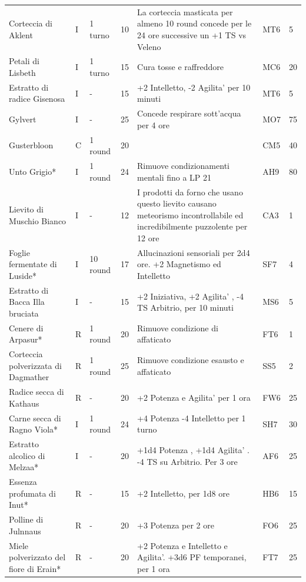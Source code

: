 \documentclass[a4paper,11pt,twoside,openany]{book}
\begin{document}
{\begin{longtable}{|L{3.2cm} |k{0.7cm} |k{1.7cm}| D{1cm} |L{5cm} |k{1.5cm} |k{1cm}|}
			Corteccia di Aklent & I & 1 turno & 10 & La corteccia masticata per almeno 10 round concede per le 24 ore successive un +1 TS vs Veleno& MT6 & 5\\
			Petali di Lisbeth  & I & 1 turno & 15 & Cura tosse e raffreddore & MC6 & 20\\
			Estratto di radice Gisenosa & I & - & 15 & +2 Intelletto, -2 Agilita' per 10 minuti & MT6 & 5\\
			Gylvert& I & - & 25 & Concede respirare sott'acqua per 4 ore & MO7 & 75\\
			Gusterbloon  & C & 1 round & 20 & & CM5 & 40\\
			Unto Grigio{*}  & I & 1 round & 24 & Rimuove condizionamenti mentali fino a LP 21 & AH9 & 80\\
			Lievito di Muschio Bianco & I & - & 12 & I prodotti da forno che usano questo lievito causano meteorismo incontrollabile ed incredibilmente puzzolente per 12 ore & CA3 & 1\\
			Foglie fermentate di Luside*& I & 10 round & 17 & Allucinazioni sensoriali per 2d4 ore. +2 Magnetismo ed Intelletto & SF7 & 4\\
			Estratto di Bacca Illa bruciata& I & - & 15 & +2 Iniziativa, +2 Agilita' , -4 TS Arbitrio, per 10 minuti& MS6 & 5\\
			Cenere di Arpasur{*}  & R & 1 round & 20 & Rimuove condizione di affaticato & FT6 & 1\\
			Corteccia polverizzata di Dagmather& R & 1 round & 25 & Rimuove condizione esausto e affaticato & SS5 & 2\\
			Radice secca di Kathaus & R & - & 20 & +2 Potenza e Agilita' per 1 ora & FW6 & 25\\
			Carne secca di Ragno Viola*  & I & 1 round & 24 & +4 Potenza -4 Intelletto per 1 turno & SH7 & 30\\
			Estratto alcolico di Melzaa*& I & - & 20 & +1d4 Potenza , +1d4 Agilita' . -4 TS su Arbitrio. Per 3 ore& AF6 & 25\\
			Essenza profumata di Inut* & R & - & 15 & +2 Intelletto, per 1d8 ore & HB6 & 15\\
			Polline di Julnnaus & R & - & 20 & +3 Potenza per 2 ore & FO6 & 25\\
			Miele polverizzato del fiore di Erain* & R & - & 20 & +2 Potenza e Intelletto e Agilita'. +3d6 PF temporanei, per 1 ora& FT7 & 25 \\
		\end{longtable}
		
}
\end{document}
